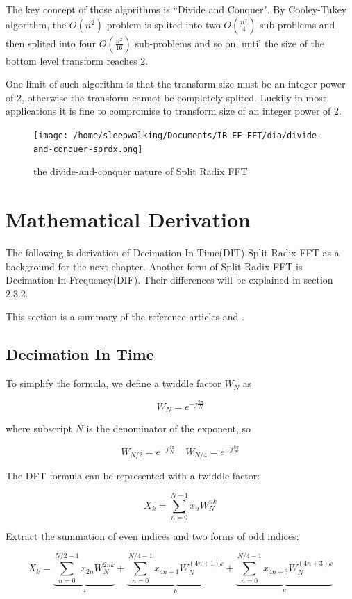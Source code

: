 \documentclass[a4paper]{report}
\begin{document}
	The key concept of those algorithms is ``Divide and Conquer". By Cooley-Tukey algorithm, the $O(n^2)$ problem is splited into two $O(\frac{n^2}{4})$ sub-problems and then splited into four $O(\frac{n^2}{16})$ sub-problems and so on, until the size of the bottom level transform reaches 2.

	One limit of such algorithm is that the transform size must be an integer power of 2, otherwise the transform cannot be completely splited. Luckily in most applications it is fine to compromise to transform size of an integer power of 2.
	
	\begin{figure}[htp]
		\centering
		\texttt{[image: /home/sleepwalking/Documents/IB-EE-FFT/dia/divide-and-conquer-sprdx.png]}
		\caption{the divide-and-conquer nature of Split Radix FFT}
	\end{figure}

\section{Mathematical Derivation} \indent

	The following is derivation of Decimation-In-Time(DIT) Split Radix FFT as a background for the next chapter. Another form of Split Radix FFT is Decimation-In-Frequency(DIF). Their differences will be explained in section 2.3.2.
	
	This section is a summary of the reference articles \cite{1984split} and \cite{douglas}.

\subsection{Decimation In Time} \indent

	To simplify the formula, we define a twiddle factor $W_N$ as
	
	\[W_N = e^{-j\frac{2\pi}{N}}\]
	
	where subscript $N$ is the denominator of the exponent, so 
	
	\[W_{N/2} = e^{-j\frac{4\pi}{N}} \quad W_{N/4} = e^{-j\frac{8\pi}{N}}\]

	The DFT formula can be represented with a twiddle factor:
	
	\[X_k = \sum^{N-1}_{n=0} x_n W_N^{nk}\]

	Extract the summation of even indices and two forms of odd indices:
	
	\[X_k = \underbrace{\sum^{N/2-1}_{n=0} x_{2n} W_{N}^{2nk}}_a
	      + \underbrace{\sum^{N/4-1}_{n=0} x_{4n+1} W_{N}^{(4n+1)k}}_b
	      + \underbrace{\sum^{N/4-1}_{n=0} x_{4n+3} W_{N}^{(4n+3)k}}_c\]
\end{document}
